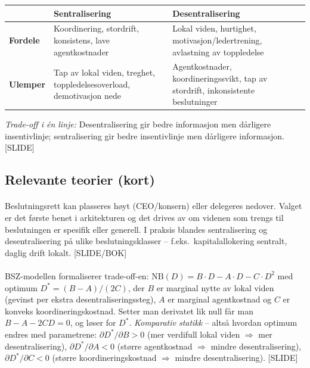 \begin{center}
\renewcommand{\arraystretch}{1.15}
\begin{tabular}{@{}p{2.5cm}p{6.0cm}p{6.0cm}@{}}
\toprule
& \textbf{Sentralisering} & \textbf{Desentralisering} \\
\midrule
\textbf{Fordele} & Koordinering, stordrift, konsistens, lave agentkostnader & Lokal viden, hurtighet, motivasjon/ledertrening, avlastning av toppledelse \\
\textbf{Ulemper} & Tap av lokal viden, treghet, toppledelsesoverload, demotivasjon nede & Agentkostnader, koordineringssvikt, tap av stordrift, inkonsistente beslutninger \\
\bottomrule
\end{tabular}
\end{center}
\emph{Trade-off i én linje:} Desentralisering gir bedre informasjon men dårligere insentivlinje; sentralisering gir bedre insentivlinje men dårligere informasjon. [SLIDE]

\subsection*{Relevante teorier (kort)}

\paragraph{\quad\SOne}
Beslutningsrett kan plasseres høyt (CEO/konsern) eller delegeres nedover. Valget er det første benet i arkitekturen og det drives av om videnen som trengs til beslutningen er spesifik eller generell. I praksis blandes sentralisering og desentralisering på ulike beslutningsklasser -- f.eks.\ kapitalallokering sentralt, daglig drift lokalt. [SLIDE/BOK]

\paragraph{\quad\SOne}
BSZ-modellen formaliserer trade-off-en: $\mathrm{NB}(D) = B \cdot D - A \cdot D - C \cdot D^{2}$ med optimum $D^{*} = (B-A)/(2C)$, der $B$ er marginal nytte av lokal viden (gevinst per ekstra desentraliseringssteg), $A$ er marginal agentkostnad og $C$ er konveks koordineringskostnad. Setter man derivatet lik null får man $B - A - 2CD = 0$, og løser for $D^{*}$. \emph{Komparativ statikk} -- altså hvordan optimum endres med parametrene: $\partial D^{*}/\partial B > 0$ (mer verdifull lokal viden $\Rightarrow$ mer desentralisering), $\partial D^{*}/\partial A < 0$ (større agentkostnad $\Rightarrow$ mindre desentralisering), $\partial D^{*}/\partial C < 0$ (større koordineringskostnad $\Rightarrow$ mindre desentralisering). [SLIDE]

